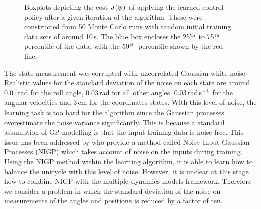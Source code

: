 \begin{figure}
{
\label{fig:uni_heu}
}
\caption{Boxplots depicting the cost $J(\boldsymbol{\psi})$ of applying the learned control policy after a given iteration of the algorithm. These were constructed from 50 Monte Carlo runs with random initial training data sets of around 10$\,$s. The blue box encloses the 25$^{\text{th}}$ to 75$^{\text{th}}$ percentile of the data, with the 50$^{\text{th}}$ percentile shown by the red line.}
\label{fig:uniplots}
\end{figure}





The state measurement was corrupted with uncorrelated Gaussian white noise. Realistic values for the standard deviation of the noise on each state are around $0.01\,$rad for the roll angle, $0.03\,$rad for all other angles, $0.03\,$rad$\,$s$^{-1}$ for the angular velocities and $3\,$cm for the coordinates states. With this level of noise, the learning task is too hard for the algorithm since the Gaussian processes overestimate the noise variance significantly. This is because a standard assumption of GP modelling is that the input training data is noise free. This issue has been addressed by \cite{MR11} who provide a method called Noisy Input Gaussian Processes (NIGP) which takes account of noise on the inputs during training. Using the NIGP method within the learning algorithm, it is able to learn how to balance the unicycle with this level of noise. However, it is unclear at this stage how to combine NIGP with the multiple dynamics models framework. Therefore we consider a problem in which the standard deviation of the noise on measurements of the angles and positions is reduced by a factor of ten.

